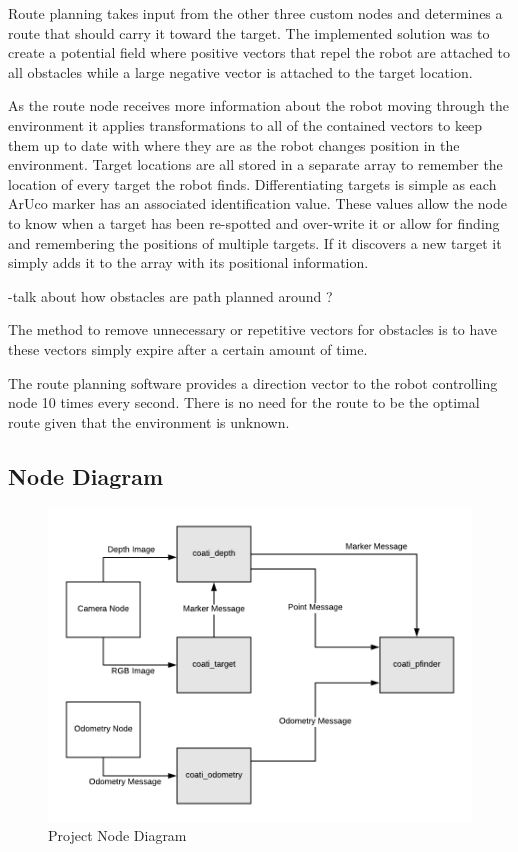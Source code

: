 \documentclass{article}
\begin{document}
	Route planning takes input from the other three custom nodes and determines a route that should carry it toward the target. The implemented solution was to create a potential field where positive vectors that repel the robot are attached to all obstacles while a large negative vector is attached to the target location.
	
	As the route node receives more information about the robot moving through the environment it applies transformations to all of the contained vectors to keep them up to date with where they are as the robot changes position in the environment. 
    Target locations are all stored in a separate array to remember the location of every target the robot finds. Differentiating targets is simple as each ArUco marker has an associated identification value. These values allow the node to know when a target has been re-spotted and over-write it or allow for finding and remembering the positions of multiple targets. If it discovers a new target it simply adds it to the array with its positional information.
   
	
-talk about how obstacles are path planned around ?    

The method to remove unnecessary or repetitive vectors for obstacles is to have these vectors simply expire after a certain amount of time. 

	The route planning software provides a direction vector to the robot controlling node 10 times every second. There is no need for the route to be the optimal route given that the environment is unknown.

	\subsection{Node Diagram}

	\begin{figure}[H]
		\centering
		\includegraphics[width=0.8\linewidth]{NodeDiagram}
		\caption{Project Node Diagram}
		\label{fig:nodediagram}
	\end{figure}
\end{document}
